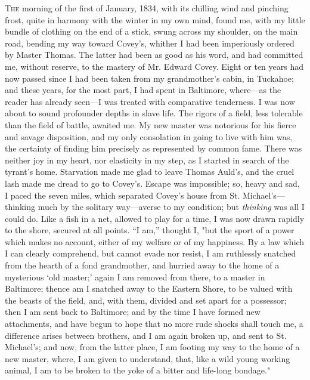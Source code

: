 \textsc{The} morning of the first of January, 1834, with its chilling
wind and pinching frost, quite in harmony with the winter in my own
mind, found me, with my little bundle of clothing on the end of a stick,
swung across my shoulder, on the main road, bending my way toward
Covey's, whither I had been imperiously ordered by Master Thomas. The
latter had been as good as his word, and had committed me, without
reserve, to the mastery of Mr. Edward Covey. Eight or ten years had now
passed since I had been taken from my grandmother's cabin, in Tuckahoe;
and these years, for the most part, I had spent in Baltimore, where---as
the reader has already seen---I was treated with comparative tenderness.
I was now about to sound profounder depths in slave life. The
{\protect\hypertarget{206}{}{}}rigors of a field, less tolerable than
the field of battle, awaited me. My new master was notorious for his
fierce and savage disposition, and my only consolation in going to live
with him was, the certainty of finding him precisely as represented by
common fame. There was neither joy in my heart, nor elasticity in my
step, as I started in search of the tyrant's home. Starvation made me
glad to leave Thomas Auld's, and the cruel lash made me dread to go to
Covey's. Escape was impossible; so, heavy and sad, I paced the seven
miles, which separated Covey's house from St. Michael's---thinking much
by the solitary way---averse to my condition; but \emph{thinking} was
all I could do. Like a fish in a net, allowed to play for a time, I was
now drawn rapidly to the shore, secured at all points. ``I am,'' thought
I, "but the sport of a power which makes no account, either of my
welfare or of my happiness. By a law which I can clearly comprehend, but
cannot evade nor resist, I am ruthlessly snatched from the hearth of a
fond grandmother, and hurried away to the home of a mysterious `old
master;' again I am removed from there, to a master in Baltimore; thence
am I snatched away to the Eastern Shore, to be valued with the beasts of
the field, and, with them, divided and set apart for a possessor; then I
am sent back to Baltimore; and by the time I have formed new
attachments, and have begun to hope that no more rude shocks shall touch
me, a difference arises between brothers, and I am again broken up, and
sent to St. Michael's; and now, from the latter place, I am footing my
way to the home of a new master, where, I am given to understand, that,
{\protect\hypertarget{207}{}{}}like a wild young working animal, I am to
be broken to the yoke of a bitter and life-long bondage."

